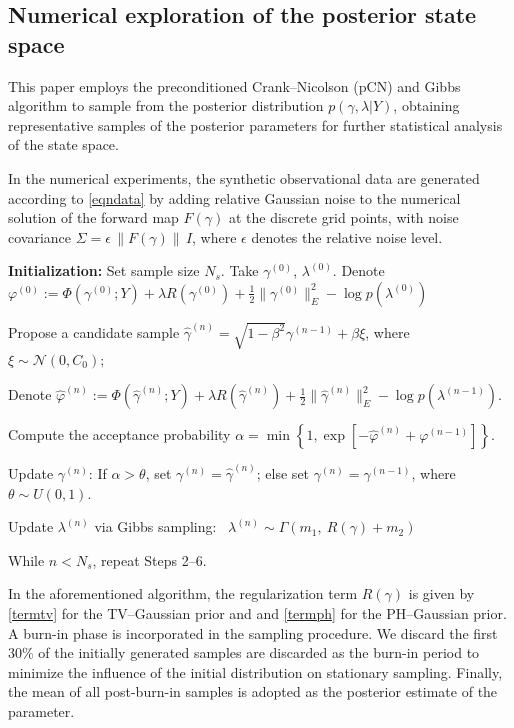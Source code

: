 \documentclass{ws-mplb}
\begin{document}
\subsection{Numerical exploration of the posterior state space }

This paper employs the preconditioned Crank–Nicolson (pCN) and Gibbs algorithm to sample from the posterior distribution $p(\gamma,\lambda|Y)$, obtaining representative samples of the posterior parameters for further statistical analysis of the state space.

In the numerical experiments, the synthetic observational data are generated according to \eqref{eqndata} by adding relative Gaussian noise to the numerical solution of the forward map $F(\gamma)$ at the discrete grid points, with noise covariance $\Sigma = \epsilon \, \|F(\gamma)\| \, I$, where $\epsilon$ denotes the relative noise level.

\begin{algorithm}
\caption{}
\label{alg:myalg}
\begin{algorithmic}[1]
\State \textbf{Initialization:} Set sample size \( N_s \). Take \( \gamma^{(0)}  \), \( \lambda^{(0)} \). Denote
$\varphi^{(0)} := \Phi(\gamma^{(0)}; Y) + \lambda R(\gamma^{(0)})+ \frac{1}{2}\|\gamma^{(0)}\|_E^2- \log p(\lambda^{(0)})$

\State Propose a candidate sample $\hat{\gamma}^{(n)} = \sqrt{1 - \beta^2} \gamma^{(n-1)} + \beta \xi$, where $\xi \sim \mathcal{N}(0, C_0);$

\State Denote
$
\hat{\varphi}^{(n)} := \Phi(\hat{\gamma}^{(n)}; Y) +\lambda R(\hat{\gamma}^{(n)})+ \frac{1}{2}\|\hat\gamma^{(n)}\|_E^2- \log p({\lambda}^{(n-1)})$.

\State Compute the acceptance probability \( \alpha = \min\left\{1, \exp\left[-\hat{\varphi}^{(n)} + \varphi^{(n-1)}\right]\right\} \).

\State Update \( \gamma^{(n)}\): If \( \alpha > \theta \), set \( \gamma^{(n)} = \hat{\gamma}^{(n)} \); else set \( \gamma^{(n)} = \gamma^{(n-1)} \), where \( \theta\sim U(0, 1) \).

\State Update $\lambda^{(n)}$ via Gibbs sampling: \ $\lambda^{(n)} \sim \Gamma\left( m_1,\ R(\gamma) + m_2 \right)$

\State While \( n < N_s \), repeat Steps 2–6.
\end{algorithmic}
\end{algorithm}

In the aforementioned algorithm, the regularization term ${R(\gamma)}$ is given by \eqref{termtv} for the TV–Gaussian prior and and \eqref{termph} for the PH–Gaussian prior. A burn-in phase is incorporated in the sampling procedure. We discard the first 30$\%$ of the initially generated samples are discarded as the burn-in period to minimize the influence of the initial distribution on stationary sampling. Finally, the mean of all post-burn-in samples is adopted as the posterior estimate of the parameter.
\end{document}
